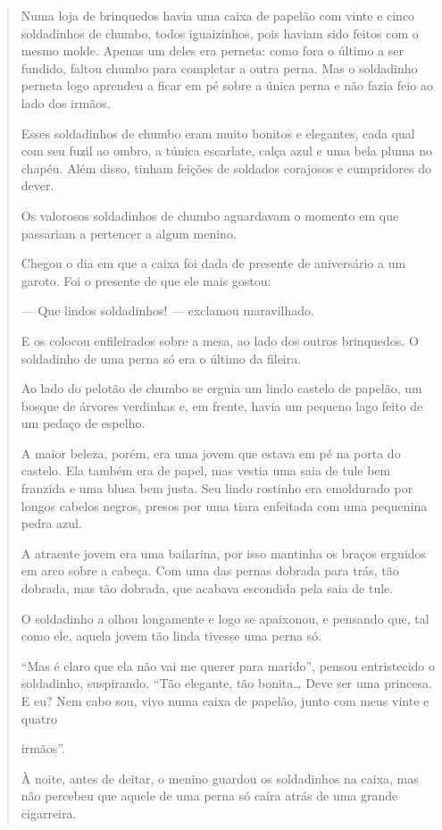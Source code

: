 \begin{itemize}
{{{\begin{itemize}
\begin{itemize}
\begin{itemize}
\begin{quote}
Numa loja de brinquedos havia uma caixa de papelão com vinte e cinco
soldadinhos de chumbo, todos iguaizinhos, pois haviam sido feitos com o
mesmo molde. Apenas um deles era perneta: como fora o último a ser
fundido, faltou chumbo para completar a outra perna. Mas o soldadinho
perneta logo aprendeu a ficar em pé sobre a única perna e não fazia feio
ao lado dos irmãos.

Esses soldadinhos de chumbo eram muito bonitos e elegantes, cada qual
com seu fuzil ao ombro, a túnica escarlate, calça azul e uma bela pluma
no chapéu. Além disso, tinham feições de soldados corajosos e
cumpridores do dever.

Os valorosos soldadinhos de chumbo aguardavam o momento em que passariam
a pertencer a algum menino.

Chegou o dia em que a caixa foi dada de presente de aniversário a um
garoto. Foi o presente de que ele mais gostou:

--- Que lindos soldadinhos! --- exclamou maravilhado.

E os colocou enfileirados sobre a mesa, ao lado dos outros brinquedos. O
soldadinho de uma perna só era o último da fileira.

Ao lado do pelotão de chumbo se erguia um lindo castelo de papelão, um
bosque de árvores verdinhas e, em frente, havia um pequeno lago feito de
um pedaço de espelho.

A maior beleza, porém, era uma jovem que estava em pé na porta do
castelo. Ela também era de papel, mas vestia uma saia de tule bem
franzida e uma blusa bem justa. Seu lindo rostinho era emoldurado por
longos cabelos negros, presos por uma tiara enfeitada com uma pequenina
pedra azul.

A atraente jovem era uma bailarina, por isso mantinha os braços erguidos
em arco sobre a cabeça. Com uma das pernas dobrada para trás, tão
dobrada, mas tão dobrada, que acabava escondida pela saia de tule.

O soldadinho a olhou longamente e logo se apaixonou, e pensando que, tal
como ele, aquela jovem tão linda tivesse uma perna só.

``Mas é claro que ela não vai me querer para marido'', pensou
entristecido o soldadinho, suspirando. ``Tão elegante, tão
bonita\ldots{} Deve ser uma princesa. E eu? Nem cabo sou, vivo numa
caixa de papelão, junto com meus vinte e quatro

irmãos''.

À noite, antes de deitar, o menino guardou os soldadinhos na caixa, mas
não percebeu que aquele de uma perna só caíra atrás de uma grande
cigarreira.


\end{quote}
\end{itemize}
\end{itemize}
\end{itemize}}}}
\end{itemize}
